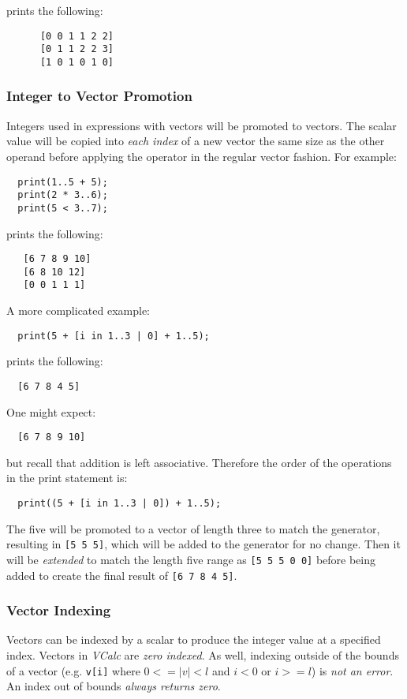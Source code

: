 \documentclass{article}
\newcommand{\code}[1]{\texttt{\textmd{#1}}}
\begin{document}
\begin{enumerate}
    prints the following:
    \begin{lstlisting}
      [0 0 1 1 2 2]
      [0 1 1 2 2 3]
      [1 0 1 0 1 0]
    \end{lstlisting}
\end{enumerate}

\subsubsection{Integer to Vector Promotion}
Integers used in expressions with vectors will be promoted to vectors. The scalar value will be
copied into \textit{each index} of a new vector the same size as the other operand before applying
the operator in the regular vector fashion. For example:
\begin{lstlisting}
  print(1..5 + 5);
  print(2 * 3..6);
  print(5 < 3..7);
\end{lstlisting}

 prints the following:
 \begin{lstlisting}
   [6 7 8 9 10]
   [6 8 10 12]
   [0 0 1 1 1]
 \end{lstlisting}

A more complicated example:
\begin{lstlisting}
  print(5 + [i in 1..3 | 0] + 1..5);
\end{lstlisting}

prints the following:
\begin{lstlisting}
  [6 7 8 4 5]
\end{lstlisting}

One might expect:
\begin{lstlisting}
  [6 7 8 9 10]
\end{lstlisting}

but recall that addition is left associative. Therefore the order of the operations in the print
statement is:
\begin{lstlisting}
  print((5 + [i in 1..3 | 0]) + 1..5);
\end{lstlisting}

The five will be promoted to a vector of length three to match the generator, resulting in
\code{[5 5 5]}, which will be added to the generator for no change. Then it will be
\textit{extended} to match the length five range as \code{[5 5 5 0 0]} before being added to create
the final result of \code{[6 7 8 4 5]}.

\subsubsection{Vector Indexing}
Vectors can be indexed by a scalar to produce the integer value at a specified index. Vectors in
\textit{VCalc} are \textit{zero indexed}. As well, indexing outside of the bounds of a vector (e.g.
\code{v[i]} where $ 0 <= |v| < l$ and $ i < 0 $ or $ i >= l$) is \textit{not an error}. An
index out of bounds \textit{always returns zero}.
\end{document}

